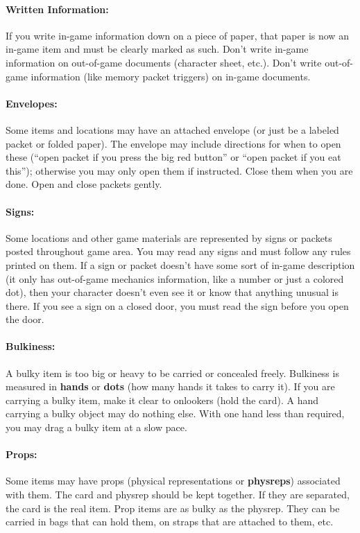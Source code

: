 \documentclass[sheet]{airship}
\begin{document}
\paragraph{Written Information:} If you write in-game information down
on a piece of paper, that paper is now an in-game item and must be
clearly marked as such.  Don't write in-game information on
out-of-game documents (character sheet, etc.).  Don't write
out-of-game information (like memory packet triggers) on in-game
documents.

\paragraph{Envelopes:} Some items and locations may have an attached
envelope (or just be a labeled packet or folded paper).  The envelope
may include directions for when to open these (``open packet if you
press the big red button'' or ``open packet if you eat this'');
otherwise you may only open them if instructed.  Close them when you
are done.  Open and close packets gently.

\paragraph{Signs:} Some locations and other game materials are
represented by signs or packets posted throughout game area.  You may
read any signs and must follow any rules printed on them.  If a sign
or packet doesn't have some sort of in-game description (it only has
out-of-game mechanics information, like a number or just a colored
dot), then your character doesn't even see it or know that anything
unusual is there.  If you see a sign on a closed door, you must read
the sign before you open the door.

\paragraph{Bulkiness:} A bulky item is too big or heavy to be carried
or concealed freely.  Bulkiness is measured in {\bf hands} or {\bf
dots} (how many hands it takes to carry it).  If you are carrying a
bulky item, make it clear to onlookers (hold the card).  A hand
carrying a bulky object may do nothing else.  With one hand less than
required, you may drag a bulky item at a slow pace.

\paragraph{Props:} Some items may have props (physical representations
or {\bf physreps}) associated with them.  The card and physrep should
be kept together.  If they are separated, the card is the real item.
Prop items are as bulky as the physrep.  They can be carried in bags
that can hold them, on straps that are attached to them, etc.
\end{document}
